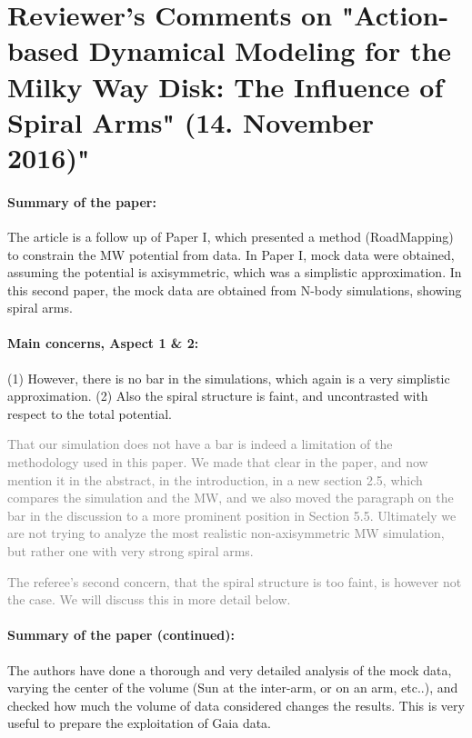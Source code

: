 \documentclass[10pt,a4paper]{article}
\newcommand{\Answer}[1]{\textcolor{Gray}{#1}}
\begin{document}
\section*{Reviewer's Comments on "Action-based Dynamical Modeling for the Milky Way Disk: The Influence of Spiral Arms" (14. November 2016)"}

\paragraph{Summary of the paper:} The article is a follow up of Paper I, which presented a method (RoadMapping) to constrain the MW potential from data. In Paper I, mock data were obtained, assuming
the potential is axisymmetric, which was a simplistic approximation. In this second
paper, the mock data are obtained from N-body simulations, showing spiral arms.

\paragraph{Main concerns, Aspect 1 \& 2:} (1) However, there is no bar in the simulations, which again is a very simplistic approximation.  (2) Also the spiral structure is faint, and uncontrasted with respect to
the total potential.

\Answer{That our simulation does not have a bar is indeed a limitation of the methodology used in this paper. We made that clear in the paper, and now mention it in the abstract, in the introduction, in a new section 2.5, which compares the simulation and the MW, and we also moved the paragraph on the bar in the discussion to a more prominent position in Section 5.5. Ultimately we are not trying to analyze the most realistic non-axisymmetric MW simulation, but rather one with very strong spiral arms.}

\Answer{The referee's second concern, that the spiral structure is too faint, is however not the case. We will discuss this in more detail below.}
 
\paragraph{Summary of the paper (continued):} The authors have done a thorough and very detailed analysis of the mock data, varying the center of the volume (Sun at the inter-arm, or on an arm, etc..), and
checked how much the volume of data considered changes the results. This is very
useful to prepare the exploitation of Gaia data.
\end{document}
